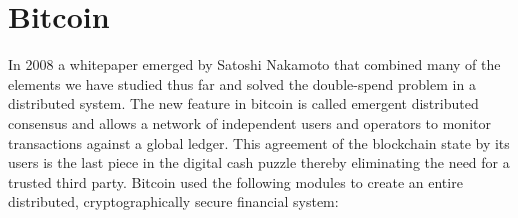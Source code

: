 

\section{Bitcoin}\label{Se:bitcoin}

In 2008 a whitepaper emerged by Satoshi Nakamoto that combined many of the elements we have studied thus far and solved the double-spend problem in a distributed system. The new feature in bitcoin is called emergent distributed consensus and allows a network of independent users and operators to monitor transactions against a global ledger. This agreement of the blockchain state by its users is the last piece in the digital cash puzzle thereby eliminating the need for a trusted third party.
Bitcoin used the following modules to create an entire distributed, cryptographically secure financial system:

